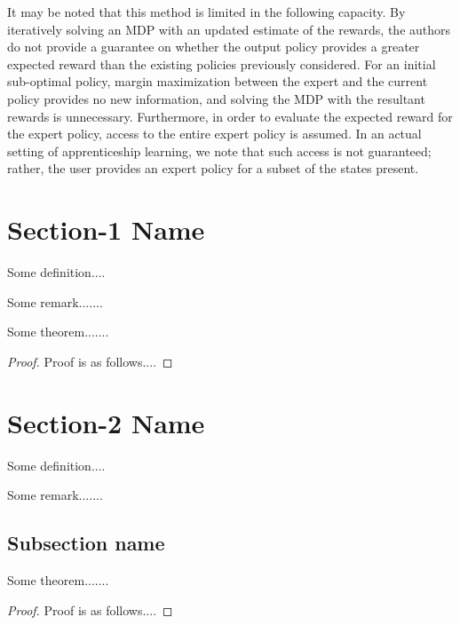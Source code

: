 It may be noted that this method is limited in the following capacity. 
By iteratively solving an MDP with an updated estimate of the rewards, the authors do not provide a guarantee on whether the output policy provides a greater expected reward than the existing policies previously considered. For an initial sub-optimal policy, margin maximization between the expert and the current policy provides no new information, and solving the MDP with the resultant rewards is unnecessary. Furthermore, in order to evaluate the expected reward for the expert policy, access to the entire expert policy is assumed. In an actual setting of apprenticeship learning, we note that such access is not guaranteed; rather, the user provides an expert policy for a subset of the states present. \\






\section{Section-1 Name}
\begin{definition}\label{abc3}
Some definition....
\end{definition}

\begin{remark}
Some remark.......
\end{remark}



\begin{theorem}
Some theorem.......
\end{theorem}

\begin{proof}
Proof is as follows....
\end{proof}

\section{Section-2 Name}
\begin{definition}\label{abc4}
Some definition....
\end{definition}

\begin{remark}
Some remark.......
\end{remark}

\subsection{Subsection name}

\begin{theorem}
Some theorem.......
\end{theorem}

\begin{proof}
Proof is as follows....
\end{proof}
